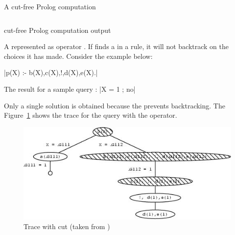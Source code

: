 \documentclass[thesis-solanki.tex]{subfiles}
\begin{document}
\begin{code-list}[H]
  \begin{singlespace}
    \inputminted[linenos]{prolog}{prlgcutfreeexmpl.pl}
  \end{singlespace}
  \caption{A cut-free Prolog computation \cite{website:cutprologunionedu}}
\label{tab:prlgcutfreeexmpl}
\end{code-list}

\begin{code-list}[H]
  \begin{singlespace}
    \inputminted[linenos]{prolog}{prlgcutfreeexmploutput.pl}
  \end{singlespace}
  \caption{cut-free Prolog computation output\cite{website:cutprologunionedu}}
\label{tab:prlgcutfreeexmploutput}
\end{code-list}

A  represented as \prologConstruct{!} operator \cite{website:prologcut}.
If  finds a  in a rule, it will not backtrack on the choices it has made. Consider the example below:

|p(X) :- b(X),c(X),!,d(X),e(X).|

The result for a sample query :
|X = 1 ; no|

Only a single solution is obtained because the  prevents backtracking. The Figure~\ref{fig:Trace with cut} shows the 
trace for the query with the  operator.

\begin{figure}[H]
\centering
\includegraphics[scale = .95]{prologcutrace.jpeg}
\caption{Trace with cut (taken from \cite{website:cutprologunionedu})}
\label{fig:Trace with cut}
\end{figure}


\end{document}
